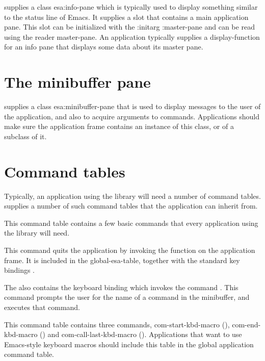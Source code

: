 \sysname{} supplies a class esa:info-pane which is typically used to display
something similar to the status line of Emacs.  It supplies a slot
that contains a main application pane.  This slot can be initialized
with the :initarg :master-pane and can be read using the reader
master-pane.  An application typically supplies a \clim{}
display-function for an info pane that displays some data about its 
master pane. 

\section{The minibuffer pane}

\sysname{} supplies a class esa:minibuffer-pane that is used to display
messages to the user of the application, and also to acquire arguments
to commands.  Applications should make sure the application frame
contains an instance of this class, or of a subclass of it.  

\section{Command tables}

Typically, an application using the \sysname{} library will need a number of
\clim{} command tables.  \sysname{} supplies a number of such command tables
that the application can inherit from.  


This command table contains a few basic commands that every
application using the \sysname{} library will need.

 {}

This command quits the application by invoking the \clim{} function
 on the application frame.  It is included in the
global-esa-table, together with the standard key bindings .

The  also contains the keyboard binding
 which invokes the command .  This
command prompts the user for the name of a command in the minibuffer,
and executes that command.


This command table contains three commands, com-start-kbd-macro
(), com-end-kbd-macro () and
com-call-last-kbd-macro ().  Applications that want to use
Emacs-style keyboard macros should include this table in the global
application command table.
